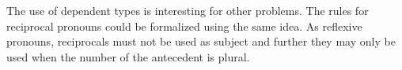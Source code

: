 \documentclass{report}
\begin{document}
The use of dependent types is interesting for other problems.
The rules for reciprocal pronouns could be formalized using the same idea. As reflexive pronouns, reciprocals
must not be used as subject and further they may only be used when the number of the antecedent is plural.
%
%
%



\end{document}
